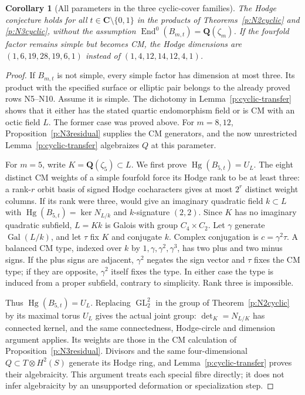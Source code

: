 \documentclass[11pt,reqno]{article}
\theoremstyle{emphasizedplain}
\newtheorem{corollary}[theorem]{Corollary}
\theoremstyle{emphasizeddefinition}
\theoremstyle{emphasizeddefinition}
\DeclareMathOperator{\End}{End}
\DeclareMathOperator{\Hg}{Hg}
\DeclareMathOperator{\GL}{GL}
\newcommand{\Q}{\mathbf Q}
\newcommand{\C}{\mathbf C}
\begin{document}
\begin{corollary}[All parameters in the three cyclic-cover families]
\label{p:cyclic-allparameters}
The Hodge conjecture holds for all $t\in\C\setminus\{0,1\}$
in the products of Theorems~\ref{p:N2cyclic} and
\ref{p:N3cyclic}, without the assumption
$\End^0(B_{m,t})=\Q(\zeta_m)$. If the fourfold factor remains
simple but becomes CM, the Hodge dimensions are
$(1,6,19,28,19,6,1)$ instead of $(1,4,12,14,12,4,1)$.
\end{corollary}
\begin{proof}
If $B_{m,t}$ is not simple, every simple factor has dimension at
most three. Its product with the specified surface or elliptic
pair belongs to the already proved rows N5--N10. Assume it is
simple. The dichotomy in Lemma~\ref{p:cyclic-transfer} shows
that it either has the stated quartic endomorphism field or is CM
with an octic field $L$. The former case was proved above.
For $m=8,12$, Proposition~\ref{p:N3residual} supplies the CM
generators, and the now unrestricted
Lemma~\ref{p:cyclic-transfer} algebraizes $Q$ at this parameter.

For $m=5$, write $K=\Q(\zeta_5)\subset L$. We first prove
$\Hg(B_{5,t})=U_L$. The eight distinct CM weights of a simple
fourfold force its Hodge rank to be at least three: a rank-$r$
orbit basis of signed Hodge cocharacters gives at most $2^r$
distinct weight columns. If its rank were three,
\cite[Lemma (3.7)]{MZ} would give an imaginary quadratic field
$k\subset L$ with $\Hg(B_{5,t})=\ker N_{L/k}$ and
$k$-signature $(2,2)$. Since $K$ has no imaginary quadratic
subfield, $L=Kk$ is Galois with group $C_4\times C_2$.
Let $\gamma$ generate $\operatorname{Gal}(L/k)$, and let $\tau$
fix $K$ and conjugate $k$. Complex conjugation is
$c=\gamma^2\tau$. A balanced CM type, indexed over $k$ by
$1,\gamma,\gamma^2,\gamma^3$, has two plus and two minus signs.
If the plus signs are adjacent, $\gamma^2$ negates the sign vector
and $\tau$ fixes the CM type; if they are opposite, $\gamma^2$
itself fixes the type. In either case the type is induced from a
proper subfield, contrary to simplicity. Rank three is impossible.

Thus $\Hg(B_{5,t})=U_L$. Replacing $\GL_2^2$ in the group of
Theorem~\ref{p:N2cyclic} by its maximal torus $U_L$ gives the
actual joint group: $\det_K=N_{L/K}$ has connected kernel, and
the same connectedness, Hodge-circle and dimension argument
applies. Its weights are those in the CM calculation of
Proposition~\ref{p:N3residual}. Divisors and the same four-dimensional
$Q\subset T\otimes H^2(S)$ generate its Hodge ring, and
Lemma~\ref{p:cyclic-transfer} proves their algebraicity. This
argument treats each special fibre directly; it does not infer
algebraicity by an unsupported deformation or specialization step.
\end{proof}
\end{document}
